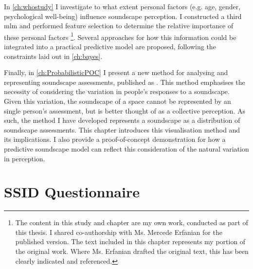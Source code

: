 \documentclass[twoside,fontsize=12pt,titlepage,chapterprefix=true
]{scrbook}
\begin{document}
In \cref{ch:whostudy} I investigate to what extent personal factors (e.g. age, gender, psychological well-being) influence soundscape perception. I constructed a third \gls{mlm} and performed feature selection to determine the relative importance of these personal factors \citep{Erfanian2021Psychological}\footnote{The content in this study and chapter are my own work, conducted as part of this thesis. I shared co-authorship with Ms. Mercede Erfanian for the published version. The text included in this chapter represents my portion of the original work. Where Ms. Erfanian drafted the original text, this has been clearly indicated and referenced.}. Several approaches for how this information could be integrated into a practical predictive model are proposed, following the constraints laid out in \cref{ch:bayes}.

Finally, in \cref{ch:ProbabilisticPOC} I present a new method for analysing and representing soundscape assessments, published as \citet{Mitchell2022How}. This method emphasises the necessity of considering the variation in people's responses to a soundscape. Given this variation, the soundscape of a space cannot be represented by an single person's assessment, but is better thought of as a collective perception. As such, the method I have developed represents a soundscape as a distribution of soundscape assessments. This chapter introduces this visualisation method and its implications. I also provide a proof-of-concept demonstration for how a predictive soundscape model can reflect this consideration of the natural variation in perception.











\printglossaries



\appendix


\chapter{SSID Questionnaire}\label{app:questionnaire}

\end{document}
